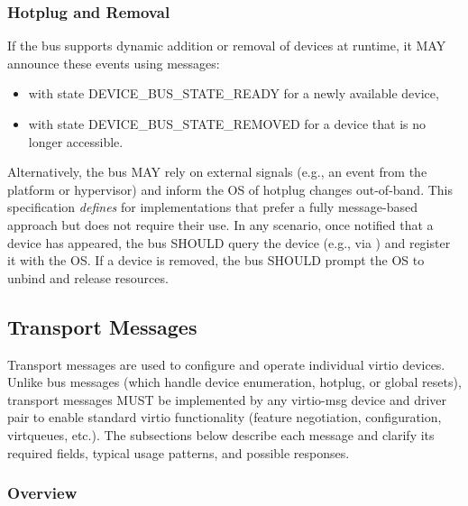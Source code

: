 \subsubsection{Hotplug and Removal}
\label{sec:Virtio Transport Options / Virtio Over Messages / Device Operation / Hotplug and Removal}

If the bus supports dynamic addition or removal of devices at runtime, it
MAY announce these events using messages:
\begin{itemize}
  \item {} with state DEVICE_BUS_STATE_READY for a newly
    available device,
  \item {} with state DEVICE_BUS_STATE_REMOVED for a device
    that is no longer accessible.
\end{itemize}

Alternatively, the bus MAY rely on external signals (e.g., an event from
the platform or hypervisor) and inform the OS of hotplug changes out-of-band.
This specification \emph{defines} 
for implementations that prefer a fully message-based
approach but does not require their use. In any scenario, once notified that a
device has appeared, the bus SHOULD query the device (e.g., via
) and register it with the OS. If a device is
removed, the bus SHOULD prompt the OS to unbind and release resources.

\subsection{Transport Messages}\label{sec:Virtio Transport Options / Virtio Over Messages / Transport Messages}

Transport messages are used to configure and operate individual virtio devices.
Unlike bus messages (which handle device enumeration, hotplug, or global resets),
transport messages MUST be implemented by any virtio-msg device and
driver pair to enable standard virtio functionality (feature negotiation,
configuration, virtqueues, etc.). The subsections below describe each message
and clarify its required fields, typical usage patterns, and possible responses.

\subsubsection{Overview}
\label{sec:Virtio Transport Options / Virtio Over Messages / Transport Messages / Overview}

